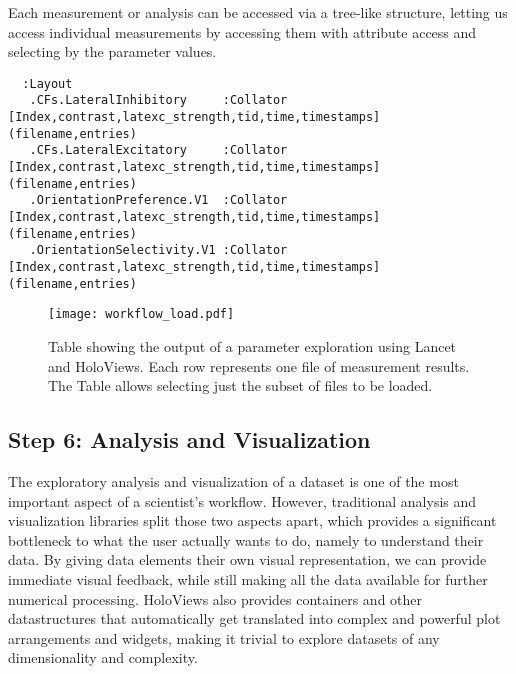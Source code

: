 Each measurement or analysis can be accessed via a tree-like
structure, letting us access individual measurements by accessing them
with attribute access and selecting by the parameter values.

\begin{minipage}{\linewidth}
\begin{lstlisting}
  :Layout
   .CFs.LateralInhibitory     :Collator   [Index,contrast,latexc_strength,tid,time,timestamps]   (filename,entries)
   .CFs.LateralExcitatory     :Collator   [Index,contrast,latexc_strength,tid,time,timestamps]   (filename,entries)
   .OrientationPreference.V1  :Collator   [Index,contrast,latexc_strength,tid,time,timestamps]   (filename,entries)
   .OrientationSelectivity.V1 :Collator   [Index,contrast,latexc_strength,tid,time,timestamps]   (filename,entries)
\end{lstlisting}
\end{minipage}


\begin{figure}
	\centering
        \texttt{[image: workflow\_load.pdf]}
	    \caption[Table summarizing results from parameter analysis in
          Lancet and HoloViews.]{Table showing the output of a
          parameter exploration using Lancet and HoloViews. Each row
          represents one file of measurement results. The Table allows
          selecting just the subset of files to be loaded.}
	\label{workflow_load}
\end{figure}


\subsection{Step 6: Analysis and Visualization}

The exploratory analysis and visualization of a dataset is one of the
most important aspect of a scientist's workflow. However, traditional
analysis and visualization libraries split those two aspects apart,
which provides a significant bottleneck to what the user actually
wants to do, namely to understand their data. By giving data elements
their own visual representation, we can provide immediate visual
feedback, while still making all the data available for further
numerical processing. HoloViews also provides containers and other
datastructures that automatically get translated into complex and powerful plot
arrangements and widgets, making it trivial to explore datasets of any
dimensionality and complexity.

